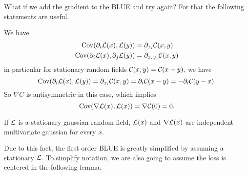 What if we add the gradient to the BLUE and try again?
For that the following
statements are useful.
\begin{lemma}
	We have
	\begin{align*}
		\operatorname{Cov}(\partial_i\mathcal{L}(x), \mathcal{L}(y)) &= \partial_{x_i} \mathcal{C}(x,y)\\
		\operatorname{Cov}(\partial_i\mathcal{L}(x), \partial_j \mathcal{L}(y)) &= \partial_{x_i y_j} \mathcal{C}(x,y)
	\end{align*}
	in particular for stationary random fields \(\mathcal{C}(x,y)=\mathcal{C}(x-y)\), we have 
	\begin{equation*}
		\operatorname{Cov}(\partial_i\mathcal{L}(x), \mathcal{L}(y))
		= \partial_{x_i} \mathcal{C}(x,y) = \partial_i \mathcal{C}(x-y) = - \partial_i \mathcal{C}(y-x).
	\end{equation*}
	So \(\nabla C\) is antisymmetric in this case, which implies 
	\begin{equation*}
		\operatorname{Cov}(\nabla\mathcal{L}(x), \mathcal{L}(x)) = \nabla \mathcal{C}(0)=0.
	\end{equation*}
\end{lemma}

\begin{corollary}
	If \(\mathcal{L}\) is a stationary gaussian random field, \(\mathcal{L}(x)\) and
	\(\nabla\mathcal{L}(x)\) are independent multivariate gaussian for every \(x\).
\end{corollary}

Due to this fact, the first order BLUE is greatly simplified by assuming a
stationary \(\mathcal{L}\). To simplify notation, we are also going to assume
the loss is centered in the following lemma.

